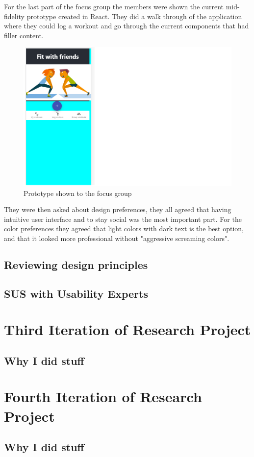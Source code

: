 For the last part of the focus group the members were shown the current mid-fidelity prototype created in React. They did a walk through of the application where they could log a workout and go through the current components that had filler content.
\begin{figure}[H]
    \centering
    \includegraphics[scale=0.6]{figures/appenSaaLangt.png}
    \caption{Prototype shown to the focus group}
    \label{ReactProt}
\end{figure}

They were then asked about design preferences, they all agreed that having intuitive user interface and to stay social was the most important part.
For the color preferences they agreed that light colors with dark text is the best option, and that it looked more professional without "aggressive screaming colors".
\subsection{Reviewing design principles}

\subsection{SUS with Usability Experts}






\section{Third Iteration of Research Project}
\subsection{Why I did stuff}
\section{Fourth Iteration of Research Project}
\subsection{Why I did stuff}
